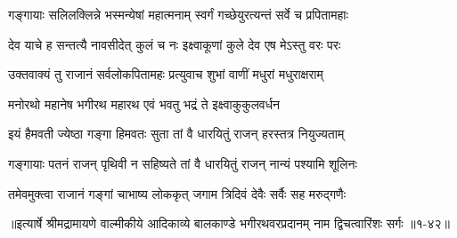 \twolineshloka
{गङ्गायाः सलिलक्लिन्ने भस्मन्येषां महात्मनाम्}
{स्वर्गं गच्छेयुरत्यन्तं सर्वे च प्रपितामहाः} %

\twolineshloka
{देव याचे ह सन्तत्यै नावसीदेत् कुलं च नः}
{इक्ष्वाकूणां कुले देव एष मेऽस्तु वरः परः} %

\twolineshloka
{उक्तवाक्यं तु राजानं सर्वलोकपितामहः}
{प्रत्युवाच शुभां वाणीं मधुरां मधुराक्षराम्} %

\twolineshloka
{मनोरथो महानेष भगीरथ महारथ}
{एवं भवतु भद्रं ते इक्ष्वाकुकुलवर्धन} %

\twolineshloka
{इयं हैमवती ज्येष्ठा गङ्गा हिमवतः सुता}
{तां वै धारयितुं राजन् हरस्तत्र नियुज्यताम्} %

\twolineshloka
{गङ्गायाः पतनं राजन् पृथिवी न सहिष्यते}
{तां वै धारयितुं राजन् नान्यं पश्यामि शूलिनः} %

\twolineshloka
{तमेवमुक्त्वा राजानं गङ्गां चाभाष्य लोककृत्}
{जगाम त्रिदिवं देवैः सर्वैः सह मरुद्गणैः} %


॥इत्यार्षे श्रीमद्रामायणे वाल्मीकीये आदिकाव्ये बालकाण्डे भगीरथवरप्रदानम् नाम द्विचत्वारिंशः सर्गः ॥१-४२॥
